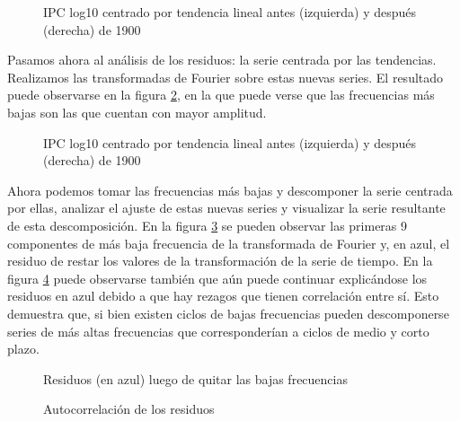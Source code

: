 \documentclass[a4paper]{article}
\begin{document}
\begin{figure}[H]
	\centering
	\caption{IPC log10 centrado por tendencia lineal antes (izquierda) y después (derecha) de 1900} 	
	\label{fig:cpi_log10_cntr}
\end{figure}

Pasamos ahora al análisis de los residuos: la serie centrada por las tendencias. Realizamos las transformadas de Fourier sobre estas nuevas series. El resultado puede observarse en la figura \ref{fig:cpi_log10_cntr_fft}, en la que puede verse que las frecuencias más bajas son las que cuentan con mayor amplitud.

\begin{figure}[H]
	\centering
	\caption{IPC log10 centrado por tendencia lineal antes (izquierda) y después (derecha) de 1900} 	
	\label{fig:cpi_log10_cntr_fft}
\end{figure}

Ahora podemos tomar las frecuencias más bajas y descomponer la serie centrada por ellas, analizar el ajuste de estas nuevas series y visualizar la serie resultante de esta descomposición. En la figura \ref{fig:cpi_cntr_antifft} se pueden observar las primeras 9 componentes de más baja frecuencia de la transformada de Fourier y, en azul, el residuo de restar los valores de la transformación de la serie de tiempo. En la figura \ref{fig:cpi_cntr_acf} puede observarse también que aún puede continuar explicándose los residuos en azul debido a que hay rezagos que tienen correlación entre sí. Esto demuestra que, si bien existen ciclos de bajas frecuencias pueden descomponerse series de más altas frecuencias que corresponderían a ciclos de medio y corto plazo.

\begin{figure}[H]
	\centering
	\caption{Residuos (en azul) luego de quitar las bajas frecuencias} 	
	\label{fig:cpi_cntr_antifft}
\end{figure}

\begin{figure}[H]
	\centering
	\caption{Autocorrelación de los residuos}
	\label{fig:cpi_cntr_acf}
\end{figure}
\end{document}

